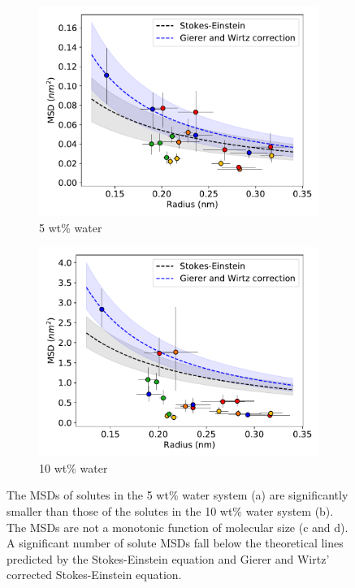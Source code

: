 \documentclass[journal=jpcbfk,manuscript=article]{achemso}
\begin{document}
\begin{figure}[!htb]
\begin{subfigure}{0.45\textwidth}
  \includegraphics[width=\textwidth]{msd_radius_5wt.pdf} 
  \caption{5 wt\% water}\label{fig:msd_radius_5wt}
  \end{subfigure}
  \begin{subfigure}{0.45\textwidth}
  \includegraphics[width=\textwidth]{msd_radius_10wt.pdf} 
  \caption{10 wt\% water}\label{fig:msd_radius_10wt}
  \end{subfigure}
  \caption{The MSDs of solutes in the 5 wt\% water system (a) are significantly
  smaller than those of the solutes in the 10 wt\% water system (b). The
  MSDs are not a monotonic function of molecular size (c and d). A significant
  number of solute MSDs fall below the theoretical lines predicted by the 
  Stokes-Einstein equation and Gierer and Wirtz' corrected Stokes-Einstein equation.
  }\label{fig:msds}
  \end{figure}
    
\end{document}
